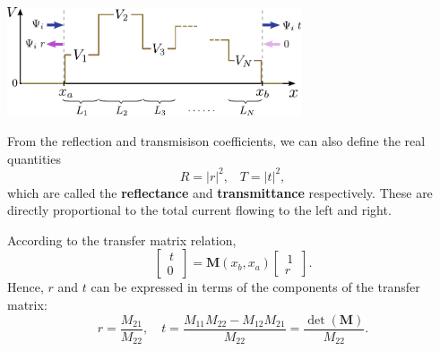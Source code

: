 \documentclass[prx,12pt]{revtex4-2}
\begin{document}
\begin{center}
  \includegraphics[width=0.65\textwidth]{transfer_matrix_setup3}
\end{center}

From the reflection and transmisison coefficients, we can also define
the real quantities
\begin{equation}
  R = |r|^2, \;\;\; T = |t|^2,
\end{equation}
which are called the \textbf{reflectance} and \textbf{transmittance}
respectively.  These are directly proportional to the total current
flowing to the left and right.

According to the transfer matrix relation,
\begin{equation}
  \begin{bmatrix}\,t\, \\ 0 \end{bmatrix} = \textbf{M}(x_b,x_a) \begin{bmatrix}\,1\, \\ r
\end{bmatrix}.
\end{equation}
Hence, $r$ and $t$ can be expressed in terms of the components of the
transfer matrix:
\begin{equation}
  r = \frac{M_{21}}{M_{22}}, \quad t = \frac{M_{11} M_{22} - M_{12}M_{21}}{M_{22}} = \frac{\det(\textbf{M})}{M_{22}}.
\end{equation}
\end{document}
